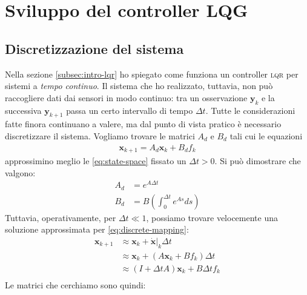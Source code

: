 \section{Sviluppo del controller \textsc{LQG}}\label{sec:lqg}
\subsection{Discretizzazione del sistema}\label{subsec:discretizzazione}
Nella sezione \ref{subsec:intro-lqr} ho spiegato come funziona un controller \textsc{lqr} per sistemi a \emph{tempo continuo}.
Il sistema che ho realizzato, tuttavia, non può raccogliere dati dai sensori in modo continuo: tra un osservazione
$\mathbf y_k$ e la successiva $\mathbf y_{k+1}$ passa un certo intervallo di tempo $\Delta t$.
Tutte le considerazioni fatte finora continuano a valere, ma dal punto di vista pratico è necessario discretizzare il sistema.
Vogliamo trovare le matrici $A_d$ e $B_d$ tali cui le equazioni
\begin{equation}
  \begin{aligned}
    \mathbf{x}_{k+1} = A_d \mathbf{x}_k + B_d f_k
  \end{aligned}
  \label{eq:moto-discreto}
\end{equation}
approssimino meglio le \eqref{eq:state-space} fissato un $\Delta t > 0$.
Si può dimostrare\cite{brunton2019data}
che valgono:
\begin{equation}
  \begin{aligned}
    A_d &= e^{A\Delta t} \\
    B_d &= B\left( \int_0^{\Delta t} e^{A s} ds \right)
  \end{aligned}
  \label{eq:discrete-mapping}
\end{equation}
Tuttavia, operativamente, per $\Delta t \ll 1$, possiamo trovare velocemente una soluzione approssimata per \eqref{eq:discrete-mapping}:
\begin{equation}
  \begin{aligned}
    \mathbf x_{k+1} &\approx \mathbf x_k + \dot {\mathbf x}|_k \Delta t\\
      &\approx \mathbf x_k + (A \mathbf x_k + B f_k) \Delta t\\
      &\approx (I + \Delta t A) \mathbf x_k + B \Delta t f_k\\
  \end{aligned}
  \label{eq:discrete-mapping-approx}
\end{equation}
Le matrici che cerchiamo sono quindi:
